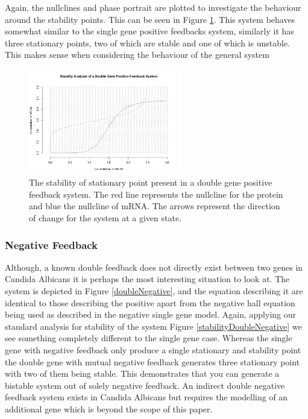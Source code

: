 \documentclass[]{article}
\begin{document}
            Again, the nullclines and phase portrait are plotted to investigate the behaviour around the stability points. This can be seen in Figure \ref{stabilityDoublePositive}. This system behaves somewhat similar to the single gene positive feedbacks system, similarly it has three stationary points, two of which are stable and one of  which is unstable. This makes sense when considering the behaviour of the general system %
            
            \begin{figure}[h!]
            \centering
            \includegraphics[width=0.6\textwidth]{./figures/stabilityDoublePositive.jpeg}
            \caption{The stability of stationary point present in a double gene positive feedback system. The red line represents the nullcline for the protein and blue the nullcline of mRNA. The arrows represent the direction of change for the system at a given state.}
            \label{stabilityDoublePositive}
            \end{figure}
            
            \subsubsection{Negative Feedback}
            Although, a known double feedback does not directly exist between two genes in Candida Albicans it is perhaps the most interesting situation to look at. The system is depicted in Figure \ref{doubleNegative}, and the equation describing it are identical to those describing the positive apart from the negative hall equation being used as described in the negative single gene model. Again, applying our standard analysis for stability of the system Figure \ref{stabilityDoubleNegative} we see something completely different to the single gene case. Whereas the single gene with negative feedback only produce a single stationary and stability point the double gene with mutual negative feedback generates three stationary point with two of them being stable. This demonstrates that you can generate a bistable system out of solely negative feedback. An indirect double negative feedback system exists in Candida Albicans but requires the modelling of an additional gene which is beyond the scope of this paper.
            
\end{document}
